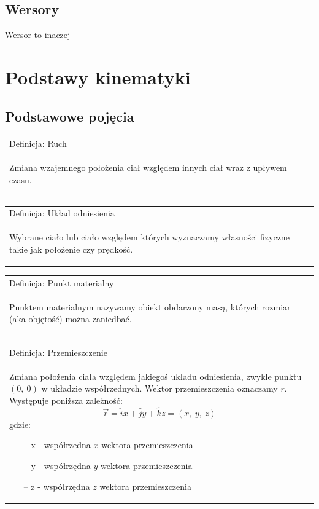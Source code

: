 \documentclass[a4paper]{article}
\newenvironment{definition}[2][Definicja]
    {
        \begin{center}
        \begin{tabular}{|p{1\textwidth}|}
        \hline
            #1: #2\\[2ex]
        \begin{em}
        \Large
    }
    { 
        \end{em}
        \\\hline
        \end{tabular} 
        \end{center}
    }
\begin{document}
    \subsection{\LARGE Wersory}
        \Large
        Wersor to inaczej
        
\section{\huge Podstawy kinematyki}
    \subsection{\LARGE Podstawowe pojęcia}
        \Large
        \begin{definition}{Ruch}
            Zmiana wzajemnego położenia ciał względem innych ciał wraz z upływem czasu.
        \end{definition}
        \begin{definition}{Układ odniesienia}
            Wybrane ciało lub ciało względem których wyznaczamy własności fizyczne takie jak położenie czy prędkość.
        \end{definition}
        \begin{definition}{Punkt materialny}
            Punktem materialnym nazywamy obiekt obdarzony masą, których rozmiar (aka objętość) można zaniedbać.
        \end{definition}
        \begin{definition}{Przemieszczenie}
            Zmiana położenia ciała względem jakiegoś układu odniesienia, zwykle punktu $(0,\ 0)$ w układzie współrzednych. 
            Wektor przemieszczenia oznaczamy $r$. Występuje poniższa zależność:
            \[\vec{r} = \hat{i}x + \hat{j}y + \hat{k}z = (x,\ y,\ z)\]
            gdzie:
            \begin{itemize}
                \item[--] x - współrzedna $x$ wektora przemieszczenia
                \item[--] y - współrzędna $y$ wektora przemieszczenia
                \item[--] z - współrzędna $z$ wektora przemieszczenia
            \end{itemize}
        \end{definition}
\end{document}
